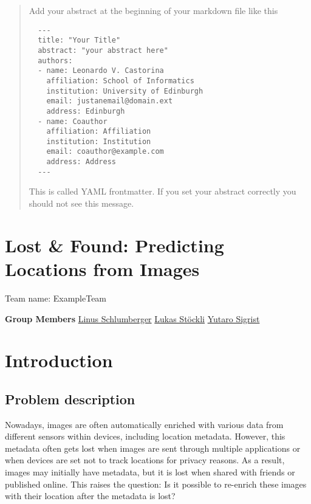 \documentclass{article}
\title{}
\author{%
}
\begin{document}
\maketitle


\begin{abstract}
    Add your abstract at the beginning of your markdown file like this 
  \begin{verbatim}
  --- 
  title: "Your Title" 
  abstract: "your abstract here"
  authors:
  - name: Leonardo V. Castorina
    affiliation: School of Informatics
    institution: University of Edinburgh
    email: justanemail@domain.ext
    address: Edinburgh
  - name: Coauthor
    affiliation: Affiliation
    institution: Institution
    email: coauthor@example.com
    address: Address
  ---
  \end{verbatim}
  This is called YAML frontmatter. If you set your abstract correctly you should not see this message.
  \end{abstract}


\section{Lost \& Found: Predicting Locations from
Images}\label{lost-found-predicting-locations-from-images}

Team name: ExampleTeam

\textbf{Group Members} \href{https://gitlab.com/Killusions}{Linus
Schlumberger} \href{https://gitlab.com/Valairaa}{Lukas Stöckli}
\href{https://gitlab.com/yusigrist}{Yutaro Sigrist}

\begin{Shaded}
\begin{Highlighting}[]
\end{Highlighting}
\end{Shaded}

\section{Introduction}\label{introduction}

\subsection{Problem description}\label{problem-description}

Nowadays, images are often automatically enriched with various data from
different sensors within devices, including location metadata. However,
this metadata often gets lost when images are sent through multiple
applications or when devices are set not to track locations for privacy
reasons. As a result, images may initially have metadata, but it is lost
when shared with friends or published online. This raises the question:
Is it possible to re-enrich these images with their location after the
metadata is lost?
\end{document}
